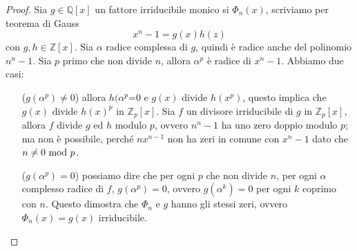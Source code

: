 \begin{proof}
	Sia $g\in\mathbb{Q}[x]$ un fattore irriducibile monico si $\Phi_n(x)$, scriviamo per teorema di Gauss
	\begin{equation*}
	x^n-1=g(x)h(z)
	\end{equation*}
	con $g,h\in\mathbb{Z}[x]$. Sia $\alpha$ radice complessa di $g$, quindi è radice anche del polinomio $n^n-1$. Sia $p$ primo che non divide $n$, allora $\alpha^p$ è radice di $x^n-1$. Abbiamo due casi:
	\begin{itemize}
		\item[($g(\alpha^p)\neq0$)] allora $h(\alpha^p$=0 e $g(x)$ divide $h(x^p)$, questo implica che $g(x)$ divide $h(x)^p$ in $\mathbb{Z}_p[x]$. Sia $f$ un divisore irriducibile di $g$ in $\mathbb{Z}_p[x]$, allora $f$ divide $g$ ed $h$ modulo $p$, ovvero $n^n-1$ ha uno zero doppio modulo $p$; ma non è possibile, perché $nx^{n-1}$ non ha zeri in comune con $x^n-1$ dato che $n\neq0\ \mathrm{mod}\ p$.
		\item[($g(\alpha^p)=0$)] possiamo dire che per ogni $p$ che non divide $n$, per ogni $\alpha$ complesso radice di $f$, $g(\alpha^p)=0$, ovvero $g(\alpha^k)=0$ per ogni $k$ coprimo con $n$. Questo dimostra che $\Phi_n$ e $g$ hanno gli stessi zeri, ovvero $\Phi_n(x)=g(x)$ irriducibile.
	\end{itemize}
\end{proof}
